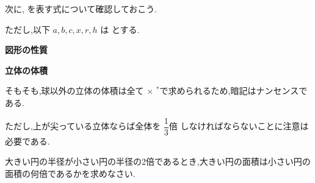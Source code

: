 \newpage

次に,\fitblankbf[図形の性質]{} を表す式について確認しておこう.

ただし,以下 $a,b,c,x,r,h$ は \fitblankbf[自然数]{} とする.

\begin{techniquebox}{\textbf{図形の性質}}
  \label{techniquebox:図形の性質}
  \begin{techniquetable}
  \end{techniquetable}
\end{techniquebox}

\begin{techniquebox}{\textbf{立体の体積}}
  \label{techniquebox:立体の体積}
  \begin{techniquetable}
  \end{techniquetable}
\end{techniquebox}

そもそも,球以外の立体の体積は全て \fitblankbf[底面積]{} $\times$ \fitblankbf[高さ]{}$^{*}$で求められるため,暗記は\mbox{ナンセンス}である.

ただし,上が尖っている立体ならば全体を \textbf{$\dfrac{1}{3}\text{倍}$} しなければならないことに注意は必要である.
\vspace{-1em}

\begin{example}[3]
  大きい円の半径が小さい円の半径の2倍であるとき,大きい円の面積は小さい円の面積の何倍であるかを求めなさい.
\end{example}
\vspace{-3em}

